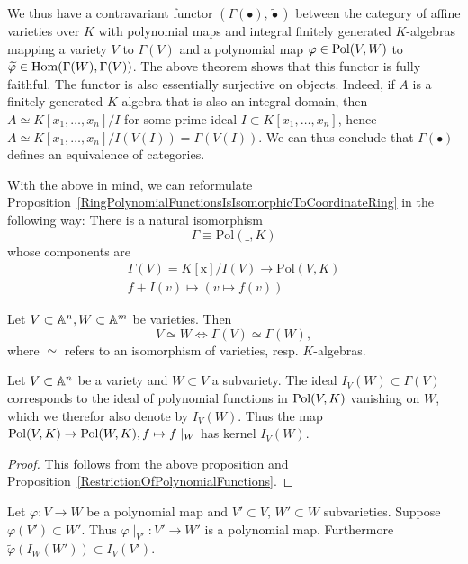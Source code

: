 \begin{remark}
    We thus have a contravariant functor $(\Gamma(\bullet),\widetilde{\bullet})$ between the category of affine varieties over $K$ with polynomial maps and integral finitely generated $K$-algebras mapping a variety $V$ to $\Gamma(V)$ and a polynomial map $\varphi \in \mathrm{Pol}(V,W)$ to $\widetilde{\varphi}\in \mathrm{Hom}(\Gamma(W),\Gamma(V))$. The above theorem shows that this functor is fully faithful. The functor is also essentially surjective on objects. Indeed, if $A$ is a finitely generated $K$-algebra that is also an integral domain, then $A\simeq K[x_1,\dots,x_n]/I$ for some prime ideal $I\subset K[x_1,\dots,x_n]$, hence $A\simeq K[x_1,\dots,x_n]/I(V(I))= \Gamma(V(I))$. We can thus conclude that $\Gamma(\bullet)$ defines an equivalence of categories. 
\end{remark}
\begin{remark}
    With the above in mind, we can reformulate Proposition~\ref{RingPolynomialFunctionsIsIsomorphicToCoordinateRing} in the following way: There is a natural isomorphism
    $$
        \Gamma \equiv \mathrm{Pol}(\_,K)
    $$
    whose components are 
    \begin{gather*}
        \Gamma(V)=K[\mathrm{x}]/I(V) \rightarrow \mathrm{Pol}(V,K)\\
        f + I(v)\mapsto (v\mapsto f(v))
    \end{gather*}
\end{remark}
\begin{corollary}\label{FunctorialityOfInducedAlgebraHomomorphism}
    Let $V\subset \mathbb{A}^n, W\subset \mathbb{A}^m$ be varieties. Then 
    $$V \simeq W \iff \Gamma(V)\simeq \Gamma(W),$$
    where $\simeq$ refers to an isomorphism of varieties, resp. $K$-algebras.
\end{corollary}
\begin{proposition}
    Let $V\subset \mathbb{A}^n$ be a variety and $W\subset V$ a subvariety. The ideal $I_V(W)\subset \Gamma(V)$ corresponds to the ideal of polynomial functions in $\mathrm{Pol}(V,K)$ vanishing on $W$, which we therefor also denote by $I_V(W)$. Thus the map $\mathrm{Pol}(V,K)\rightarrow \mathrm{Pol}(W,K), f \mapsto f\mid_W$ has kernel $I_V(W)$.
\end{proposition}
\begin{proof}
    This follows from the above proposition and Proposition~\ref{RestrictionOfPolynomialFunctions}.
\end{proof}
\begin{proposition}
    Let $\varphi : V \rightarrow W$ be a polynomial map and $V'\subset V$, $W'\subset W$ subvarieties. Suppose $\varphi(V')\subset W'$. Thus  $\varphi\mid_{V'} : V'\rightarrow W'$ is a polynomial map. Furthermore $\widetilde{\varphi}(I_W(W')) \subset I_V(V')$.  
\end{proposition}
